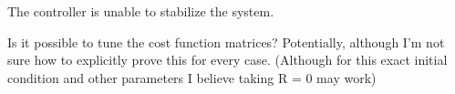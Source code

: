 \documentclass[]{article}
\begin{document}
The controller is unable to stabilize the system.

Is it possible to tune the cost function matrices? Potentially, although I'm not sure how to explicitly prove this for every case. (Although for this exact initial condition and other parameters I believe taking R = 0 may work)













% 





\end{document}
